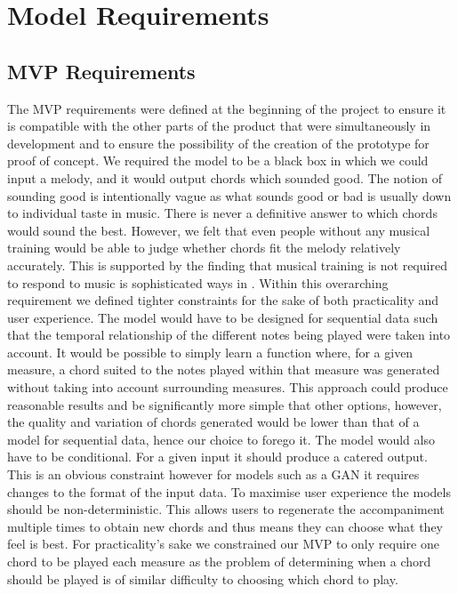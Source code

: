 \section{Model Requirements}
\label{sec:Evaluation}
\subsection{MVP Requirements}
\label{sec:MVPRequirements}
The MVP requirements were defined at the beginning of the project to ensure it is compatible with the other parts of the product that were simultaneously in development and to ensure the possibility of the creation of the prototype for proof of concept. 
We required the model to be a black box in which we could input a melody, and it would output chords which sounded good.
The notion of sounding good is intentionally vague as what sounds good or bad is usually down to individual taste in music.
There is never a definitive answer to which chords would sound the best.
However, we felt that even people without any musical training would be able to judge whether chords fit the melody relatively accurately.
This is supported by the finding that musical training is not required to respond to music is sophisticated ways in \cite{ExperiencedListeners}.
Within this overarching requirement we defined tighter constraints for the sake of both practicality and user experience. 
The model would have to be designed for sequential data such that the temporal relationship of the different notes being played were taken into account.
It would be possible to simply learn a function where, for a given measure, a chord suited to the notes played within that measure was generated without taking into account surrounding measures.
This approach could produce reasonable results and be significantly more simple that other options, however, the quality and variation of chords generated would be lower than that of a model for sequential data, hence our choice to forego it.
The model would also have to be conditional. For a given input it should produce a catered output. This is an obvious constraint however for models such as a GAN it requires changes to the format of the input data.
To maximise user experience the models should be non-deterministic. This allows users to regenerate the accompaniment multiple times to obtain new chords and thus means they can choose what they feel is best.
For practicality's sake we constrained our MVP to only require one chord to be played each measure as the problem of determining when a chord should be played is of similar difficulty to choosing which chord to play.
